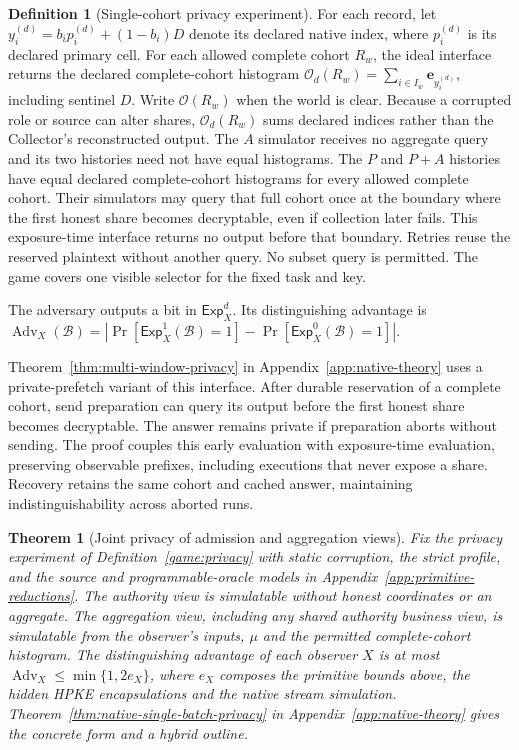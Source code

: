 \documentclass[conference,compsoc]{IEEEtran}
\theoremstyle{definition}
\newtheorem{definition}{Definition}[section]
\newtheorem{definition}{Definition}
\numberwithin{equation}{section}
\numberwithin{table}{section}
\numberwithin{figure}{section}
\theoremstyle{plain}
\newtheorem{theorem}{Theorem}[section]
\newtheorem{theorem}{Theorem}
\begin{document}
\begin{definition}[Single-cohort privacy experiment]
For each record, let \(y_i^{(d)}=b_i p_i^{(d)}+(1-b_i)D\) denote its
declared native index, where \(p_i^{(d)}\) is its declared primary cell. For
each allowed complete cohort \(R_w\), the ideal interface returns the
declared complete-cohort histogram \(\mathcal O_d(R_w)=\sum_{i\in I_w}
\mathbf e_{y_i^{(d)}}\), including sentinel \(D\). Write \(\mathcal O(R_w)\)
when the world is clear. Because a corrupted role or source can alter shares, \(\mathcal O_d(R_w)\)
sums declared indices rather than the Collector's reconstructed output. The \(A\)
simulator receives no aggregate query and its two histories need not have
equal histograms. The \(P\) and \(P{+}A\) histories have equal declared complete-cohort histograms for
every allowed complete cohort. Their simulators may query that full cohort
once at the boundary where the first honest share becomes decryptable, even if
collection later fails. This exposure-time interface returns no output
before that boundary. Retries reuse the reserved plaintext without another
query. No subset query is permitted. The game covers one visible selector
for the fixed task and key.

The adversary outputs a bit in \(\mathsf{Exp}_X^d\). Its distinguishing
advantage is \(\operatorname{Adv}_X(\mathcal B)=
|\Pr[\mathsf{Exp}_X^1(\mathcal B)=1]-
\Pr[\mathsf{Exp}_X^0(\mathcal B)=1]|\).
\end{definition}

Theorem~\ref{thm:multi-window-privacy} in Appendix~\ref{app:native-theory} uses a private-prefetch variant of this
interface. After durable reservation of a complete cohort, send preparation
can query its output before the first honest share becomes decryptable. The answer
remains private if preparation aborts without sending. The proof couples
this early evaluation with exposure-time evaluation, preserving observable
prefixes, including executions that never expose a share. Recovery retains
the same cohort and cached answer, maintaining indistinguishability across aborted runs.

\begin{theorem}[Joint privacy of admission and aggregation views]
\label{thm:joint-privacy-main}
Fix the privacy experiment of Definition~\ref{game:privacy} with static corruption,
the strict profile, and the source and programmable-oracle models in
Appendix~\ref{app:primitive-reductions}. The authority view is simulatable without honest coordinates or an aggregate.
The aggregation view, including any shared authority business view, is simulatable
from the observer's inputs, \(\mu\) and the permitted complete-cohort histogram. The distinguishing advantage of each observer \(X\) is at most
\(\operatorname{Adv}_X\le\min\{1,2e_X\}\), where \(e_X\) composes the
primitive bounds above, the hidden HPKE encapsulations and the native
stream simulation. Theorem~\ref{thm:native-single-batch-privacy} in Appendix~\ref{app:native-theory} gives the
concrete form and a hybrid outline.
\end{theorem}
\end{document}

